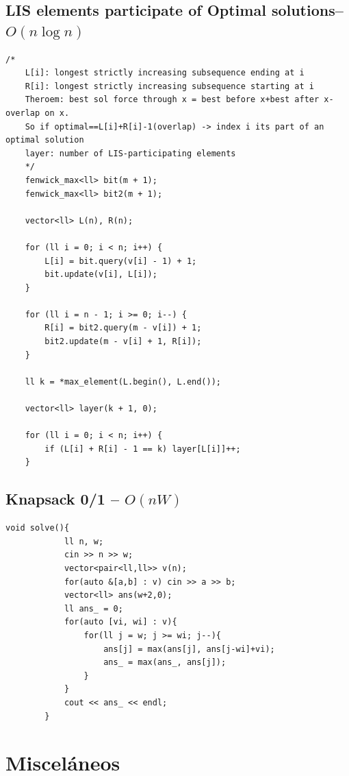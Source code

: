 \documentclass[10pt,a4paper,twocolumn]{article}
\begin{document}
	\subsection{LIS elements participate of Optimal solutions-- $O(n \log n)$}
	\begin{lstlisting}[style=cpp, title={LIS$\_$elements$\_$optimal.cpp}]
    /*
    L[i]: longest strictly increasing subsequence ending at i
    R[i]: longest strictly increasing subsequence starting at i
    Theroem: best sol force through x = best before x+best after x-overlap on x.
    So if optimal==L[i]+R[i]-1(overlap) -> index i its part of an optimal solution
    layer: number of LIS-participating elements
    */
    fenwick_max<ll> bit(m + 1);
    fenwick_max<ll> bit2(m + 1);

    vector<ll> L(n), R(n);

    for (ll i = 0; i < n; i++) {
        L[i] = bit.query(v[i] - 1) + 1;
        bit.update(v[i], L[i]);
    }

    for (ll i = n - 1; i >= 0; i--) {
        R[i] = bit2.query(m - v[i]) + 1;
        bit2.update(m - v[i] + 1, R[i]);
    }

    ll k = *max_element(L.begin(), L.end());

    vector<ll> layer(k + 1, 0);

    for (ll i = 0; i < n; i++) {
        if (L[i] + R[i] - 1 == k) layer[L[i]]++;
    }
    \end{lstlisting}

    \subsection{Knapsack 0/1 -- $O(nW)$}
	
	\begin{lstlisting}[style=cpp, title={mochila.cpp}]
		void solve(){
			ll n, w;
			cin >> n >> w;
			vector<pair<ll,ll>> v(n);
			for(auto &[a,b] : v) cin >> a >> b;
			vector<ll> ans(w+2,0);
			ll ans_ = 0;
			for(auto [vi, wi] : v){
				for(ll j = w; j >= wi; j--){
					ans[j] = max(ans[j], ans[j-wi]+vi);
					ans_ = max(ans_, ans[j]);
				}
			}
			cout << ans_ << endl;
		}
	\end{lstlisting}

	\section{Miscel\'aneos}
	
\end{document}
